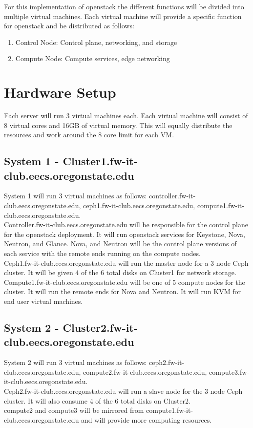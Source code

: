 \documentclass[12pt]{article}
\begin{document}
For this implementation of openstack the different functions will be divided into multiple virtual machines. Each virtual machine
will provide a specific function for openstack and be distributed as follows:
\begin{enumerate}
	\item{Control Node: Control plane, networking, and storage}
	\item{Compute Node: Compute services, edge networking}
\end{enumerate}


\section{Hardware Setup}
Each server will run 3 virtual machines each. Each virtual machine will consist of 8 virtual cores and 16GB of virtual memory. This 
will equally distribute the resources and work around the 8 core limit for each VM. 
\subsection{System 1 - Cluster1.fw-it-club.eecs.oregonstate.edu}
System 1 will run 3 virtual machines as follows: controller.fw-it-club.eecs.oregonstate.edu, ceph1.fw-it-club.eecs.oregonstate.edu, compute1.fw-it-club.eecs.oregonstate.edu.
\\
Controller.fw-it-club.eecs.oregonstate.edu will be responsible for the control plane for the openstack deployment. It will run openstack services for Keystone, Nova, Neutron,
and Glance. Nova, and Neutron will be the control plane versions of each service with the remote ends running on the compute nodes.
\\
Ceph1.fw-it-club.eecs.oregonstate.edu will run the master node for a 3 node Ceph cluster. It will be given 4 of the 6 total disks on Cluster1 for network storage.
\\
Compute1.fw-it-club.eecs.oregonstate.edu will be one of 5 compute nodes for the cluster. It will run the remote ends for Nova and Neutron. It will run KVM for 
end user virtual machines. 

\subsection{System 2 - Cluster2.fw-it-club.eecs.oregonstate.edu}
System 2 will run 3 virtual machines as follows: ceph2.fw-it-club.eecs.oregonstate.edu, compute2.fw-it-club.eecs.oregonstate.edu, compute3.fw-it-club.eecs.oregonstate.edu.
\\
Ceph2.fw-it-club.eecs.oregonstate.edu will run a slave node for the 3 node Ceph cluster. It will also consume 4 of the 6 total disks on Cluster2.
\\
compute2 and compute3 will be mirrored from compute1.fw-it-club.eecs.oregonstate.edu and will provide more computing resources.
\end{document}

